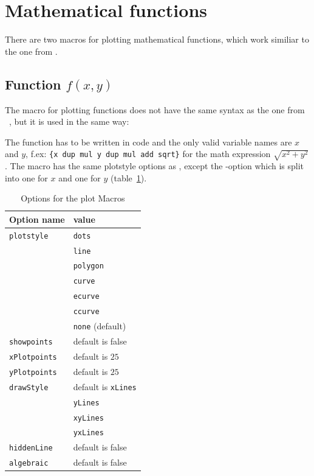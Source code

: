 \documentclass[11pt,english,bibliography=totoc,parskip=false,headings=small,
    headinclude=false,footinclude=false,twoside,english,usegeometry]{pst-doc}
\begin{document}
\section{Mathematical functions}
There are two macros for plotting mathematical functions, which work similiar to the one from .

\subsection{Function $f(x,y)$}

The macro for plotting functions does not have the same syntax as the one from 
~\cite{dtk02.1:voss:mathematischen}, but it is used in the same way:

\begin{BDef}
\OptArgs{}
\end{BDef}

The function has to be written in \PS{} code and the only valid variable names are  $x$ 
and $y$, f.ex: \verb|{x dup mul y dup mul add sqrt}| for the math expression $\sqrt{x^2 + y^2}$. 
The macro has the same plotstyle options as , except the -option which is 
split into one for $x$ and one for $y$ (table~\ref{tab:lineOptions}).

\begin{table}[htb]
\centering
\caption{Options for the plot Macros}\label{tab:lineOptions}
\smallskip
\begin{tabular}{l|l}
\textbf{Option name} & \textbf{value}\\\hline
\verb|plotstyle| &
	\verb|dots|\\
&	\verb|line|\\
&	\verb|polygon|\\
&	\verb|curve|\\
&	\verb|ecurve|\\
&	\verb|ccurve|\\
&	\verb|none| (default)\\
\verb|showpoints|  & default is false\\
\verb|xPlotpoints| & default is $25$\\
\verb|yPlotpoints| & default is $25$\\
\verb|drawStyle| & default is \verb|xLines|\\
& \verb|yLines|\\
& \verb|xyLines|\\
& \verb|yxLines|\\
\verb|hiddenLine|  & default is false\\
\verb|algebraic| & default is false
\end{tabular}
\end{table}
\end{document}
